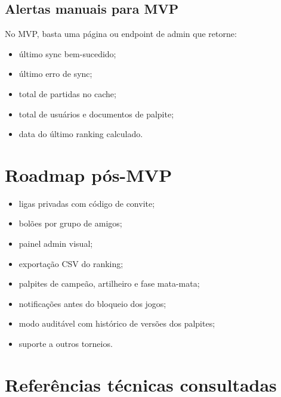 \documentclass[12pt,a4paper]{article}
\begin{document}
\subsection{Alertas manuais para MVP}

No MVP, basta uma página ou endpoint de admin que retorne:
\begin{itemize}
  \item último sync bem-sucedido;
  \item último erro de sync;
  \item total de partidas no cache;
  \item total de usuários e documentos de palpite;
  \item data do último ranking calculado.
\end{itemize}

\section{Roadmap pós-MVP}

\begin{itemize}
  \item ligas privadas com código de convite;
  \item bolões por grupo de amigos;
  \item painel admin visual;
  \item exportação CSV do ranking;
  \item palpites de campeão, artilheiro e fase mata-mata;
  \item notificações antes do bloqueio dos jogos;
  \item modo auditável com histórico de versões dos palpites;
  \item suporte a outros torneios.
\end{itemize}

\section{Referências técnicas consultadas}
\end{document}
